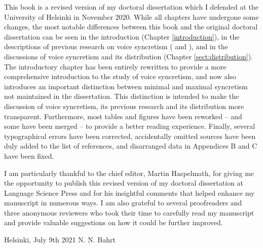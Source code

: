 \addchap{\lsPrefaceTitle}
This book is a revised version of my doctoral dissertation which I defended at the University of Helsinki in November 2020. While all chapters have undergone some changes, the most notable differences between this book and the original doctoral dissertation can be seen in the introduction (Chapter \ref{introduction}), in the descriptions of previous research on voice syncretism ( and ), and in the discussions of voice syncretism and its distribution (Chapter \ref{sect:distribution}). The introductory chapter has been entirely rewritten to provide a more comprehensive introduction to the study of voice syncretism, and now also introduces an important distinction between minimal and maximal syncretism not maintained in the dissertation. This distinction is intended to make the discussion of voice syncretism, its previous research and its distribution more transparent. Furthermore, most tables and figures have been reworked -- and some have been merged -- to provide a better reading experience. Finally, several typographical errors have been corrected, accidentally omitted sources have been duly added to the list of references, and disarranged data in Appendices B and C have been fixed.

I am particularly thankful to the chief editor, Martin Haspelmath, for giving me the opportunity to publish this revised version of my doctoral dissertation at Language Science Press and for his insightful comments that helped enhance my manuscript in numerous ways. I am also grateful to several proofreaders and three anonymous reviewers who took their time to carefully read my manuscript and provide valuable suggestions on how it could be further improved.

\bigskip

\noindent Helsinki, July 9th 2021 \hfill N. N. Bahrt